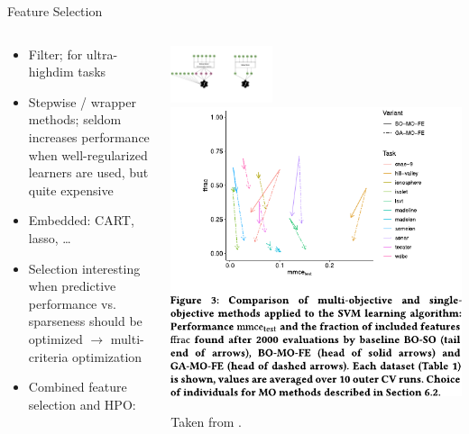 \begin{frame}{Feature Selection}
    \begin{columns}
      \begin{column}{0.4\textwidth}
        \begin{itemize}
          \item Filter; for ultra-highdim tasks
          \item Stepwise / wrapper methods; 
          seldom increases performance when well-regularized 
              learners are used, but quite expensive 
          \item Embedded: CART, lasso, \ldots 
          \item Selection interesting when predictive performance vs. sparseness
              should be optimized $\rightarrow$ multi-criteria optimization
            \item Combined feature selection and HPO: 
        \end{itemize}
      \end{column}%
      \begin{column}{0.6\textwidth}
        \begin{center}
          \includegraphics[width=0.35\textwidth, trim=450 100 110 60, clip]{images/feat_extr_vs_selection.pdf}%
          \includegraphics[width=0.55\linewidth]{images/Binder2020multiobjective_fig3.pdf}

          {\tiny \hfill Taken from .}
        \end{center}
      \end{column}
    \end{columns}
    
\end{frame}

